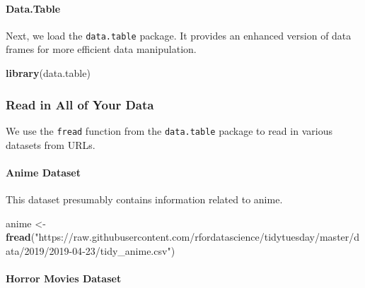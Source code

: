 \documentclass[
  b5paper]{book}
\newenvironment{Shaded}{\begin{snugshade}}{\end{snugshade}}
\newcommand{\FunctionTok}[1]{\textcolor[rgb]{0.13,0.29,0.53}{\textbf{#1}}}
\newcommand{\NormalTok}[1]{#1}
\newcommand{\OtherTok}[1]{\textcolor[rgb]{0.56,0.35,0.01}{#1}}
\newcommand{\StringTok}[1]{\textcolor[rgb]{0.31,0.60,0.02}{#1}}
\begin{document}
\hypertarget{data.table}{%
\paragraph*{Data.Table}\label{data.table}}

Next, we load the \texttt{data.table} package. It provides an enhanced version of data frames for more efficient data manipulation.

\begin{Shaded}
\begin{Highlighting}[]
\FunctionTok{library}\NormalTok{(data.table)}
\end{Highlighting}
\end{Shaded}

\hypertarget{read-in-all-of-your-data}{%
\subsubsection*{Read in All of Your Data}\label{read-in-all-of-your-data}}

We use the \texttt{fread} function from the \texttt{data.table} package to read in various datasets from URLs.

\hypertarget{anime-dataset}{%
\paragraph*{Anime Dataset}\label{anime-dataset}}

This dataset presumably contains information related to anime.

\begin{Shaded}
\begin{Highlighting}[]
\NormalTok{anime }\OtherTok{\textless{}{-}} \FunctionTok{fread}\NormalTok{(}\StringTok{"https://raw.githubusercontent.com/rfordatascience/tidytuesday/master/data/2019/2019{-}04{-}23/tidy\_anime.csv"}\NormalTok{)}
\end{Highlighting}
\end{Shaded}

\hypertarget{horror-movies-dataset}{%
\paragraph*{Horror Movies Dataset}\label{horror-movies-dataset}}
\end{document}
